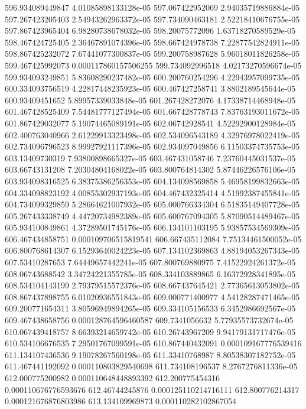 {596.934089449847 4.01085898133128e-05
597.067422952069 2.94035719886884e-05
597.267423205403 2.54943262963372e-05
597.734090463181 2.52218410676755e-05
597.867423965404 6.98280738678032e-05
598.20075772096 1.63718270589529e-05
598.467424725405 2.36467891074396e-05
598.667424978738 7.22877542824911e-05
598.867425232072 7.67441077300837e-05
599.200758987628 5.96018011826258e-05
599.467425992073 0.000117860157506255
599.734092996518 4.02173270596674e-05
599.934093249851 5.83608290237482e-05
600.200760254296 4.22943957099735e-05
600.334093756519 4.22817448235923e-05
600.467427258741 3.8802189545644e-05
600.93409451652 5.89957339033848e-05
601.267428272076 4.17338714468948e-05
601.467428525409 7.54481777127494e-05
601.667428778743 7.83763193011672e-05
601.867429032077 5.19074465089191e-05
602.06742928541 4.52292900128984e-05
602.400763040966 2.61229913323498e-05
602.534096543189 4.32976978022419e-05
602.734096796523 8.99927921117396e-05
602.934097049856 6.11503374735753e-05
603.13409730319 7.93800898665327e-05
603.467431058746 7.23760445031537e-05
603.66743131208 7.20304804168022e-05
603.800764814302 5.87446226576106e-05
603.934098316525 6.38375386256353e-05
604.134098569858 5.46958199832663e-05
604.334098823192 4.00855302937193e-05
604.467432325414 4.51992387455841e-05
604.734099329859 5.28664621007932e-05
605.000766334304 6.51835149407728e-05
605.267433338749 4.44720734982389e-05
605.600767094305 5.87090514489467e-05
605.934100849861 4.37289501745176e-05
606.134101103195 5.93857534569309e-05
606.467434858751 0.000109706515819541
606.667435112084 7.75134461500052e-05
606.800768614307 6.15293640024223e-05
607.134102369863 4.88194053267343e-05
607.53410287653 7.64449657442241e-05
607.800769880975 7.41522924261372e-05
608.06743688542 3.34724221355785e-05
608.334103889865 6.16372928341895e-05
608.534104143199 2.79379515572376e-05
608.667437645421 2.77365613053802e-05
608.867437898755 6.01020936551843e-05
609.000771400977 4.54128287471465e-05
609.200771654311 3.80596949894265e-05
609.334105156533 6.3452986692567e-05
609.467438658756 0.000128764596460587
609.7341056632 5.77935573732674e-05
610.067439418757 8.66393214659742e-05
610.26743967209 9.94179131717476e-05
610.534106676535 7.29501767099591e-05
610.867440432091 0.000109167776539416
611.134107436536 9.19078267560198e-05
611.33410768987 8.80538307182752e-05
611.467441192092 0.000110803829540698
611.734108196537 8.2767276811336e-05
612.000775200982 0.000110648448893392
612.200775454316 0.000110676776593676
612.46744245876 0.000125110214716111
612.800776214317 0.000121676876803986
613.134109969873 0.000110282102867054
}
